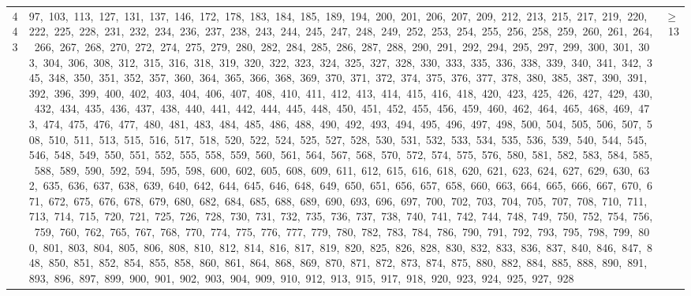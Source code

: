 \begin{longtable}{c|p{}|r}
443 & 97,\ 103,\ 113,\ 127,\ 131,\ 137,\ 146,\ 172,\ 178,\ 183,\ 184,\ 185,\ 189,\ 194,\ 200,\ 201,\ 206,\ 207,\ 209,\ 212,\ 213,\ 215,\ 217,\ 219,\ 220,\ 222,\ 225,\ 228,\ 231,\ 232,\ 234,\ 236,\ 237,\ 238,\ 243,\ 244,\ 245,\ 247,\ 248,\ 249,\ 252,\ 253,\ 254,\ 255,\ 256,\ 258,\ 259,\ 260,\ 261,\ 264,\ 266,\ 267,\ 268,\ 270,\ 272,\ 274,\ 275,\ 279,\ 280,\ 282,\ 284,\ 285,\ 286,\ 287,\ 288,\ 290,\ 291,\ 292,\ 294,\ 295,\ 297,\ 299,\ 300,\ 301,\ 303,\ 304,\ 306,\ 308,\ 312,\ 315,\ 316,\ 318,\ 319,\ 320,\ 322,\ 323,\ 324,\ 325,\ 327,\ 328,\ 330,\ 333,\ 335,\ 336,\ 338,\ 339,\ 340,\ 341,\ 342,\ 345,\ 348,\ 350,\ 351,\ 352,\ 357,\ 360,\ 364,\ 365,\ 366,\ 368,\ 369,\ 370,\ 371,\ 372,\ 374,\ 375,\ 376,\ 377,\ 378,\ 380,\ 385,\ 387,\ 390,\ 391,\ 392,\ 396,\ 399,\ 400,\ 402,\ 403,\ 404,\ 406,\ 407,\ 408,\ 410,\ 411,\ 412,\ 413,\ 414,\ 415,\ 416,\ 418,\ 420,\ 423,\ 425,\ 426,\ 427,\ 429,\ 430,\ 432,\ 434,\ 435,\ 436,\ 437,\ 438,\ 440,\ 441,\ 442,\ 444,\ 445,\ 448,\ 450,\ 451,\ 452,\ 455,\ 456,\ 459,\ 460,\ 462,\ 464,\ 465,\ 468,\ 469,\ 473,\ 474,\ 475,\ 476,\ 477,\ 480,\ 481,\ 483,\ 484,\ 485,\ 486,\ 488,\ 490,\ 492,\ 493,\ 494,\ 495,\ 496,\ 497,\ 498,\ 500,\ 504,\ 505,\ 506,\ 507,\ 508,\ 510,\ 511,\ 513,\ 515,\ 516,\ 517,\ 518,\ 520,\ 522,\ 524,\ 525,\ 527,\ 528,\ 530,\ 531,\ 532,\ 533,\ 534,\ 535,\ 536,\ 539,\ 540,\ 544,\ 545,\ 546,\ 548,\ 549,\ 550,\ 551,\ 552,\ 555,\ 558,\ 559,\ 560,\ 561,\ 564,\ 567,\ 568,\ 570,\ 572,\ 574,\ 575,\ 576,\ 580,\ 581,\ 582,\ 583,\ 584,\ 585,\ 588,\ 589,\ 590,\ 592,\ 594,\ 595,\ 598,\ 600,\ 602,\ 605,\ 608,\ 609,\ 611,\ 612,\ 615,\ 616,\ 618,\ 620,\ 621,\ 623,\ 624,\ 627,\ 629,\ 630,\ 632,\ 635,\ 636,\ 637,\ 638,\ 639,\ 640,\ 642,\ 644,\ 645,\ 646,\ 648,\ 649,\ 650,\ 651,\ 656,\ 657,\ 658,\ 660,\ 663,\ 664,\ 665,\ 666,\ 667,\ 670,\ 671,\ 672,\ 675,\ 676,\ 678,\ 679,\ 680,\ 682,\ 684,\ 685,\ 688,\ 689,\ 690,\ 693,\ 696,\ 697,\ 700,\ 702,\ 703,\ 704,\ 705,\ 707,\ 708,\ 710,\ 711,\ 713,\ 714,\ 715,\ 720,\ 721,\ 725,\ 726,\ 728,\ 730,\ 731,\ 732,\ 735,\ 736,\ 737,\ 738,\ 740,\ 741,\ 742,\ 744,\ 748,\ 749,\ 750,\ 752,\ 754,\ 756,\ 759,\ 760,\ 762,\ 765,\ 767,\ 768,\ 770,\ 774,\ 775,\ 776,\ 777,\ 779,\ 780,\ 782,\ 783,\ 784,\ 786,\ 790,\ 791,\ 792,\ 793,\ 795,\ 798,\ 799,\ 800,\ 801,\ 803,\ 804,\ 805,\ 806,\ 808,\ 810,\ 812,\ 814,\ 816,\ 817,\ 819,\ 820,\ 825,\ 826,\ 828,\ 830,\ 832,\ 833,\ 836,\ 837,\ 840,\ 846,\ 847,\ 848,\ 850,\ 851,\ 852,\ 854,\ 855,\ 858,\ 860,\ 861,\ 864,\ 868,\ 869,\ 870,\ 871,\ 872,\ 873,\ 874,\ 875,\ 880,\ 882,\ 884,\ 885,\ 888,\ 890,\ 891,\ 893,\ 896,\ 897,\ 899,\ 900,\ 901,\ 902,\ 903,\ 904,\ 909,\ 910,\ 912,\ 913,\ 915,\ 917,\ 918,\ 920,\ 923,\ 924,\ 925,\ 927,\ 928 & $\ge$ 13 \\

\end{longtable}
